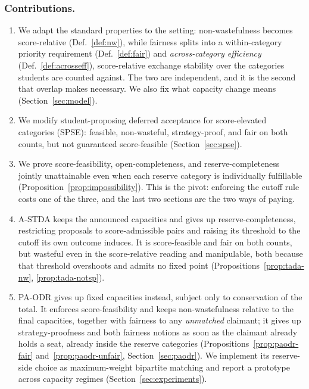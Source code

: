 \documentclass[a4paper,twoside]{article}
\theoremstyle{definition}
\begin{document}
\subsubsection{Contributions.}


\begin{enumerate}
\item We adapt the standard properties to the setting: non-wastefulness becomes score-relative (Def.~\ref{def:nw}), while fairness splits into a within-category priority requirement (Def.~\ref{def:fair}) and \emph{across-category efficiency} (Def.~\ref{def:acrosseff}), score-relative exchange stability \cite{Alca94a} over the categories students are counted against. The two are independent, and it is the second that overlap makes necessary. We also fix what capacity change means (Section~\ref{sec:model}).
\item We modify student-proposing deferred acceptance for score-elevated categories (SPSE): feasible, non-wasteful, strategy-proof, and fair on both counts, but not guaranteed score-feasible (Section~\ref{sec:spse}).
\item We prove score-feasibility, open-completeness, and reserve-completeness jointly unattainable even when each reserve category is individually fulfillable (Proposition~\ref{prop:impossibility}). This is the pivot: enforcing the cutoff rule costs one of the three, and the last two sections are the two ways of paying.
\item A-STDA keeps the announced capacities and gives up reserve-completeness, restricting proposals to score-admissible pairs and raising its threshold to the cutoff its own outcome induces. It is score-feasible and fair on both counts, but wasteful even in the score-relative reading and manipulable, both because that threshold overshoots and admits no fixed point (Propositions~\ref{prop:tada-nw}, \ref{prop:tada-notsp}).
\item PA-ODR gives up fixed capacities instead, subject only to conservation of the total. It enforces score-feasibility and keeps non-wastefulness relative to the final capacities, together with fairness to any \emph{unmatched} claimant; it gives up strategy-proofness and both fairness notions as soon as the claimant already holds a seat, already inside the reserve categories (Propositions~\ref{prop:paodr-fair} and~\ref{prop:paodr-unfair}, Section~\ref{sec:paodr}). We implement its reserve-side choice as maximum-weight bipartite matching and report a prototype across capacity regimes (Section~\ref{sec:experiments}).
\end{enumerate}
\end{document}
